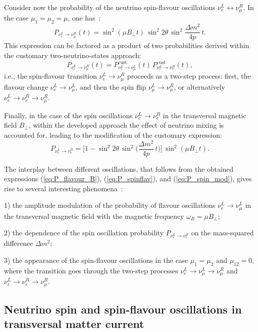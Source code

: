 \documentclass[a4paper,11pt]{article}
\begin{document}
Consider now the probability of the neutrino spin-flavour oscillations $\nu_e^L \leftrightarrow \nu_\mu^R$. In the case $\mu_1 = \mu_2 = \mu$, one has~\cite{Popov:Studenikin:2019EPJC,Studenikin:2019arXiv}:
\begin{equation}
\label{eq:P_spinflav}
P_{\nu_e^L \to \nu_\mu^R}(t) = \sin^2(\mu B_\perp t)\,\sin^2 2\theta\,\sin^2\frac{\Delta m^2}{4p}\,t.
\end{equation}
This expression can be factored as a product of two probabilities derived within the customary two-neutrino-states approach:
\begin{equation}
P_{\nu_e^L \to \nu_\mu^R}(t) = P_{\nu_e^L \to \nu_\mu^L}^{\text{cust}}(t)\,P_{\nu_e^L \to \nu_e^R}^{\text{cust}}(t),
\end{equation}
i.e., the spin-flavour transition $\nu_e^L \to \nu_\mu^R$ proceeds as a two-step process: first, the flavour change $\nu_e^L \to \nu_\mu^L$, and then the spin flip $\nu_\mu^L \to \nu_\mu^R$, or alternatively $\nu_e^L \to \nu_e^R \to \nu_\mu^R$.

Finally, in the case of the spin oscillations $\nu_e^L \to \nu_e^R$ in the transversal magnetic field $B_\perp$, within the developed approach the effect of neutrino mixing is accounted for, leading to the modification of the customary expression:
\begin{equation}
\label{eq:P_spin_mod}
P_{\nu_e^L \to \nu_e^R} = \Big[1 - \sin^2 2\theta\,\sin^2\Big(\frac{\Delta m^2}{4p}\,t\Big)\Big]\,\sin^2(\mu B_\perp t).
\end{equation}

The interplay between different oscillations, that follows from the obtained expressions (\ref{eq:P_flavour_B}), (\ref{eq:P_spinflav}), and (\ref{eq:P_spin_mod}), gives rise to several interesting phenomena~\cite{Popov:Studenikin:2019EPJC,Studenikin:2019arXiv}:

1) the amplitude modulation of the probability of flavour oscillations $\nu_e^L \to \nu_\mu^L$ in the transversal magnetic field with the magnetic frequency $\omega_B = \mu B_\perp$;

2) the dependence of the spin oscillation probability $P_{\nu_e^L \to \nu_e^R}$ on the mass-squared difference $\Delta m^2$;

3) the appearance of the spin-flavour oscillations in the case $\mu_1 = \mu_2$ and $\mu_{12} = 0$, where the transition goes through the two-step processes $\nu_e^L \to \nu_\mu^L \to \nu_\mu^R$ and $\nu_e^L \to \nu_e^R \to \nu_\mu^R$.

\subsection{Neutrino spin and spin-flavour oscillations in transversal matter current}
\end{document}
